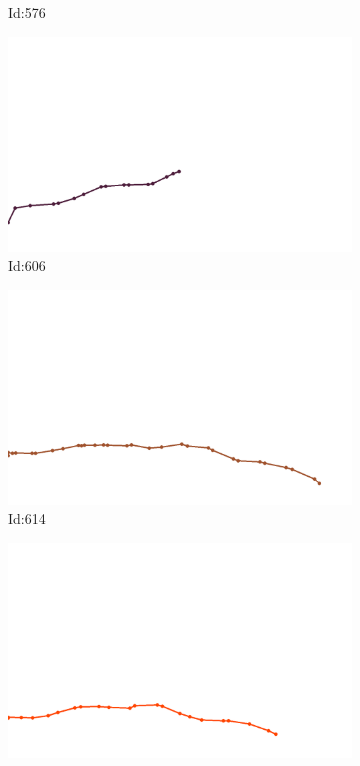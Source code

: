 \documentclass[12pt,twoside]{report}
\begin{document}
\begin{figure}
\begin{subfigure}[b]{0.20\textwidth}
\caption{Id:576}
\end{subfigure}
\begin{subfigure}[b]{0.20\textwidth}
\centering
\includegraphics[width=\textwidth]{../trajectories/606.png}
\caption{Id:606}
\end{subfigure}
\begin{subfigure}[b]{0.20\textwidth}
\centering
\includegraphics[width=\textwidth]{../trajectories/614.png}
\caption{Id:614}
\end{subfigure}
\begin{subfigure}[b]{0.20\textwidth}
\centering
\includegraphics[width=\textwidth]{../trajectories/667.png}

\end{subfigure}
\end{figure}
\end{document}
